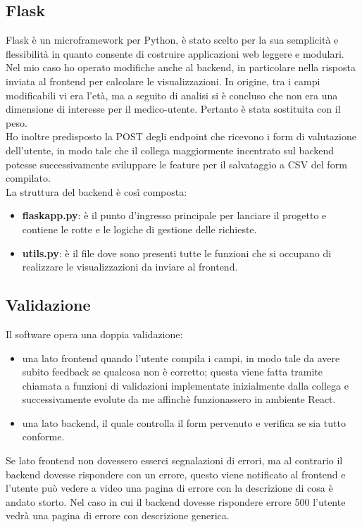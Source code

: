 \subsection{Flask}
Flask è un microframework per Python, è stato scelto per la sua semplicità e flessibilità in quanto consente di costruire applicazioni web leggere e modulari.
Nel mio caso ho operato modifiche anche al backend, in particolare nella risposta inviata al frontend per calcolare le visualizzazioni. In origine, tra i campi modificabili vi era l'età, ma a seguito di analisi si è concluso che non era una dimensione di interesse per il medico-utente. Pertanto è stata sostituita con il peso.\\ 
Ho inoltre predisposto la POST degli endpoint che ricevono i form di valutazione dell'utente, in modo tale che il collega maggiormente incentrato sul backend potesse successivamente sviluppare le feature per il salvataggio a CSV del form compilato.\\
La struttura del backend è così composta: 
\begin{itemize}
    \item \textbf{flaskapp.py}: è il punto d'ingresso principale per lanciare il progetto e contiene le rotte e le logiche di gestione delle richieste.
    \item \textbf{utils.py}: è il file dove sono presenti tutte le funzioni che si occupano di realizzare le visualizzazioni da inviare al frontend.
\end{itemize}

\subsection{Validazione}
Il software opera una doppia validazione:
\begin{itemize} 
    \item una lato frontend quando l'utente compila i campi, in modo tale da avere subito feedback se qualcosa non è corretto; questa viene fatta tramite chiamata a funzioni di validazioni implementate inizialmente dalla collega e successivamente evolute da me affinchè funzionassero in ambiente React. 
    \item una lato backend, il quale controlla il form pervenuto e verifica se sia tutto conforme.\\
\end{itemize}

Se lato frontend non dovessero esserci segnalazioni di errori, ma al contrario il backend dovesse rispondere con un errore, questo viene notificato al frontend e l'utente può vedere a video una pagina di errore con la descrizione di cosa è andato storto. Nel caso in cui il backend dovesse rispondere errore 500 l'utente vedrà una pagina di errore con descrizione generica. 

